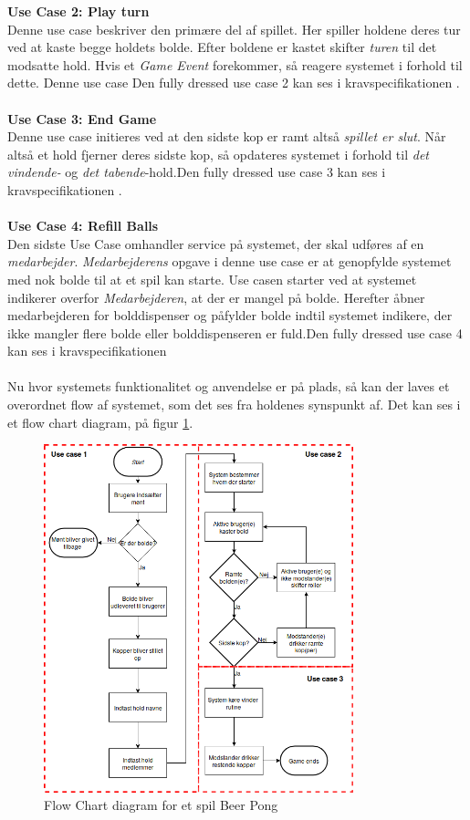 \documentclass[Rapport/Rapport_main.tex]{subfiles}
\begin{document}
\textbf{Use Case 2: Play turn}\\
Denne use case beskriver den primære del af spillet. Her spiller holdene  deres tur ved at kaste begge holdets bolde.  Efter boldene er kastet skifter \textit{turen} til det modsatte hold. Hvis et \textit{Game Event} forekommer, så reagere systemet i forhold til dette. Denne use case 
Den fully dressed use case 2 kan ses i kravspecifikationen .\\\\
\textbf{Use Case 3: End Game}\\
Denne use case initieres ved at den sidste kop er ramt altså \textit{spillet er slut}. Når altså et hold fjerner deres sidste kop, så opdateres systemet i forhold til \textit{det vindende-} og \textit{det tabende}-hold.Den fully dressed use case 3 kan ses i kravspecifikationen .\\\\
\textbf{Use Case 4: Refill Balls}\\
Den sidste Use Case omhandler service på systemet, der skal udføres af en \textit{medarbejder}. \textit{Medarbejderens} opgave i denne use case er at genopfylde systemet med nok bolde til at et spil kan starte. Use casen starter ved at systemet indikerer overfor \textit{Medarbejderen}, at der er mangel på bolde. Herefter åbner medarbejderen for bolddispenser og påfylder bolde indtil systemet indikere, der ikke mangler flere bolde eller bolddispenseren er fuld.Den fully dressed use case 4 kan ses i kravspecifikationen \\\\
Nu hvor systemets funktionalitet og anvendelse er på plads, så kan der laves et overordnet flow af systemet, som det ses fra holdenes synspunkt af. Det kan ses i et flow chart diagram, på figur \ref{fig:rap_beer_pong_flow}.
\begin{figure}[H]
    \centering
    \includegraphics[width=0.8\textwidth]{Kravspecifikation/Flowchart/pics/Beerpongflowchart.png}
    \caption{Flow Chart diagram for et spil Beer Pong}
    \label{fig:rap_beer_pong_flow}
\end{figure}
\end{document}
